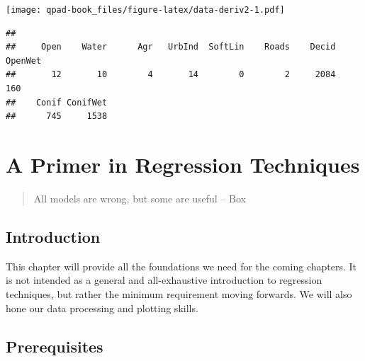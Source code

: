 \documentclass[12pt,]{book}
\newenvironment{Shaded}{\begin{snugshade}}{\end{snugshade}}
\newcommand{\CommentTok}[1]{\textcolor[rgb]{0.56,0.35,0.01}{\textit{#1}}}
\newcommand{\KeywordTok}[1]{\textcolor[rgb]{0.13,0.29,0.53}{\textbf{#1}}}
\newcommand{\NormalTok}[1]{#1}
\newcommand{\OperatorTok}[1]{\textcolor[rgb]{0.81,0.36,0.00}{\textbf{#1}}}
\newcommand{\StringTok}[1]{\textcolor[rgb]{0.31,0.60,0.02}{#1}}
\begin{document}
\texttt{[image: qpad-book\_files/figure-latex/data-deriv2-1.pdf]}

\begin{Shaded}
\end{Shaded}

\begin{verbatim}
## 
##     Open    Water      Agr   UrbInd  SoftLin    Roads    Decid  OpenWet 
##       12       10        4       14        0        2     2084      160 
##    Conif ConifWet 
##      745     1538
\end{verbatim}

\begin{Shaded}
\end{Shaded}

\hypertarget{regression}{%
\chapter{A Primer in Regression Techniques}\label{regression}}

\begin{quote}
All models are wrong, but some are useful -- Box
\end{quote}

\hypertarget{introduction-1}{%
\section{Introduction}\label{introduction-1}}

This chapter will provide all the foundations we need for the coming chapters.
It is not intended as a general and all-exhaustive introduction to
regression techniques, but rather the minimum requirement moving forwards.
We will also hone our data processing and plotting skills.

\hypertarget{prerequisites-1}{%
\section{Prerequisites}\label{prerequisites-1}}
\end{document}
